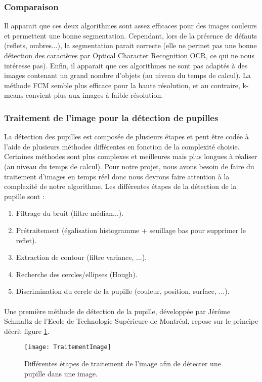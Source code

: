 \subsubsection*{Comparaison}
Il apparait que ces deux algorithmes sont assez efficaces pour des images couleurs et permettent une bonne segmentation. Cependant, lors de la présence de défauts (reflets, ombres...), la segmentation parait correcte (elle ne permet pas une bonne détection des caractères par Optical Character Recognition OCR, ce qui ne nous intéresse pas). Enfin, il apparait que ces algorithmes ne sont pas adaptés à des images contenant un grand nombre d’objets (au niveau du temps de calcul). La méthode FCM semble plus efficace pour la haute résolution, et au contraire, k-means convient plus aux images à faible résolution.

\subsubsection{Traitement de l’image pour la détection de pupilles}

La détection des pupilles est composée de plusieurs étapes et peut être codée à l’aide de plusieurs méthodes différentes en fonction de la complexité choisie. Certaines méthodes sont plus complexes et meilleures mais plus longues à réaliser (au niveau du temps de calcul). Pour notre projet, nous avons besoin de faire du traitement d’images en temps réel donc nous devrons faire attention à la complexité de notre algorithme. Les différentes étapes de la détection de la pupille sont : 
\begin{enumerate}
\item Filtrage du bruit (filtre médian...).
\item Prétraitement (égalisation histogramme + seuillage bas pour supprimer le reflet).
\item Extraction de contour (filtre variance, ...).
\item Recherche des cercles/ellipses (Hough).
\item Discrimination du cercle de la pupille (couleur, position, surface, ...).
\end{enumerate}
\paragraph{}
Une première méthode de détection de la pupille, développée par Jérôme Schmaltz de l’Ecole de Technologie Supérieure de Montréal, repose sur le principe décrit figure \ref{fig:TraitementImage}.
\begin{figure}[h]
  \centering
  \texttt{[image: TraitementImage]}
  \caption{Différentes étapes de traitement de l’image afin de détecter une pupille dans une image.}
  \label{fig:TraitementImage}
\end{figure}


